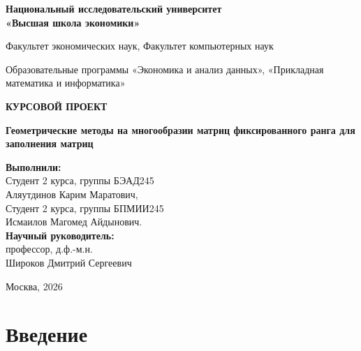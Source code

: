 \documentclass[a4paper,12pt]{article}
\begin{document}
\begin{titlepage}
    \centering
    {\large\bfseries Национальный исследовательский университет \\ «Высшая школа экономики»\par}
    \vspace{1cm}
    {\large Факультет экономических наук, Факультет компьютерных наук\par}
    {\large Образовательные программы «Экономика и анализ данных», «Прикладная математика и информатика»\par}
    \vspace{2cm}
    {\Large\bfseries КУРСОВОЙ ПРОЕКТ\par}
    \vspace{1cm}
    {\Large\bfseries Геометрические методы на многообразии матриц фиксированного ранга для заполнения матриц \par}
    \vspace{2cm}
    \begin{flushright}
        \large
        \textbf{Выполнили:}\\
        Студент 2 курса, группы БЭАД245\\
        Аляутдинов Карим Маратович,\\
        Студент 2 курса, группы БПМИИ245\\
        Исмаилов Магомед Айдынович.\\
        \vspace{0.5cm}
        \textbf{Научный руководитель:}\\
        профессор, д.ф.-м.н.\\
        Широков Дмитрий Сергеевич\\
    \end{flushright}
    \vfill
    {\large Москва, 2026\par}
\end{titlepage}

\tableofcontents
\newpage

\section*{Введение}
\end{document}

